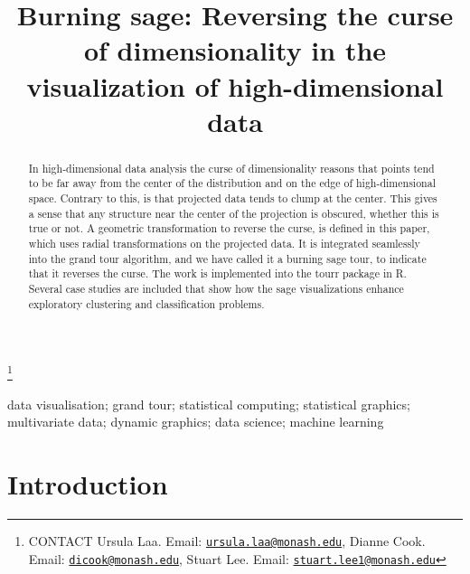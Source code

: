 \documentclass[]{interact}
\theoremstyle{plain}%
\theoremstyle{definition}
\theoremstyle{remark}
\begin{document}

\title{Burning sage: Reversing the curse of dimensionality in the
visualization of high-dimensional data}


\author{
}

\thanks{CONTACT Ursula
Laa. Email: \href{mailto:ursula.laa@monash.edu}{\nolinkurl{ursula.laa@monash.edu}}, Dianne
Cook. Email: \href{mailto:dicook@monash.edu}{\nolinkurl{dicook@monash.edu}}, Stuart
Lee. Email: \href{mailto:stuart.lee1@monash.edu}{\nolinkurl{stuart.lee1@monash.edu}}}

\maketitle

\begin{abstract}
In high-dimensional data analysis the curse of dimensionality reasons
that points tend to be far away from the center of the distribution and
on the edge of high-dimensional space. Contrary to this, is that
projected data tends to clump at the center. This gives a sense that any
structure near the center of the projection is obscured, whether this is
true or not. A geometric transformation to reverse the curse, is defined
in this paper, which uses radial transformations on the projected data.
It is integrated seamlessly into the grand tour algorithm, and we have
called it a burning sage tour, to indicate that it reverses the curse.
The work is implemented into the tourr package in R. Several case
studies are included that show how the sage visualizations enhance
exploratory clustering and classification problems.
\end{abstract}

\begin{keywords}
data visualisation; grand tour; statistical computing; statistical
graphics; multivariate data; dynamic graphics; data science; machine
learning
\end{keywords}

\doublespacing

\hypertarget{introduction}{%
\section{Introduction}\label{introduction}}
\end{document}
